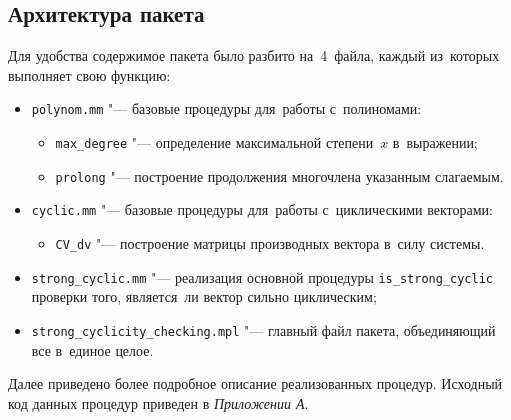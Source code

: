 \newpage

\subsection{Архитектура пакета}

Для удобства содержимое пакета было разбито на~4~файла, каждый из~которых выполняет свою функцию:

\begin{itemize}
    \item
        \verb|polynom.mm| "--- базовые процедуры для~работы с~полиномами:
        \begin{itemize}
            \item
                \verb|max_degree| "--- определение максимальной степени~$x$ в~выражении;
            \item
                \verb|prolong| "--- построение продолжения многочлена указанным слагаемым.
        \end{itemize}
    \item
        \verb|cyclic.mm| "--- базовые процедуры для~работы с~циклическими векторами:
        \begin{itemize}
            \item
                \verb|CV_dv| "--- построение матрицы производных вектора в~силу системы.
        \end{itemize}
    \item
        \verb|strong_cyclic.mm| "--- реализация основной процедуры \verb|is_strong_cyclic| проверки того,
        является~ли вектор сильно циклическим;
    \item
        \verb|strong_cyclicity_checking.mpl| "--- главный файл пакета, объединяющий все в~единое целое.
\end{itemize}

Далее приведено более подробное описание реализованных процедур.
Исходный код данных процедур приведен в \emph{Приложении А}.

